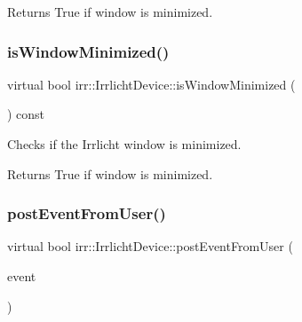 \begin{DoxyReturn}{Returns}
True if window is minimized. 
\end{DoxyReturn}
\mbox{\label{classirr_1_1IrrlichtDevice_a69e96b9c49c65391e406377a92e795b1}} 
\subsubsection{\texorpdfstring{is\+Window\+Minimized()}{isWindowMinimized()}\hspace{0.1cm}{\footnotesize\ttfamily [3/3]}}
{\footnotesize\ttfamily virtual bool irr\+::\+Irrlicht\+Device\+::is\+Window\+Minimized (\begin{DoxyParamCaption}{ }\end{DoxyParamCaption}) const\hspace{0.3cm}{\ttfamily [pure virtual]}}



Checks if the Irrlicht window is minimized. 

\begin{DoxyReturn}{Returns}
True if window is minimized. 
\end{DoxyReturn}
\mbox{\label{classirr_1_1IrrlichtDevice_abf859e39f017b0403c6ed331e48e01df}} 
\subsubsection{\texorpdfstring{post\+Event\+From\+User()}{postEventFromUser()}\hspace{0.1cm}{\footnotesize\ttfamily [1/3]}}
{\footnotesize\ttfamily virtual bool irr\+::\+Irrlicht\+Device\+::post\+Event\+From\+User (\begin{DoxyParamCaption}\item[{const \hyperlink{structirr_1_1SEvent}{S\+Event} \&}]{event }\end{DoxyParamCaption})\hspace{0.3cm}{\ttfamily [pure virtual]}}



